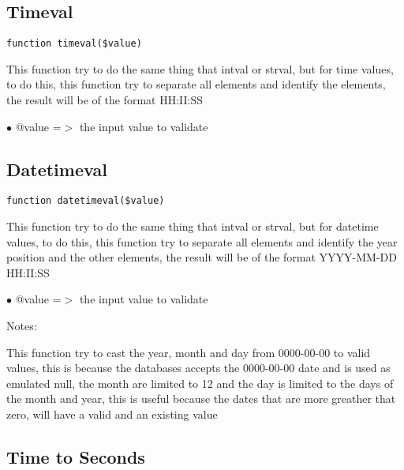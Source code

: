 \documentclass[a4paper]{book}
\begin{document}
\hypertarget{toc80}{}
\subsection{Timeval}

\begin{lstlisting}
function timeval($value)
\end{lstlisting}

This function try to do the same thing that intval or strval, but for time
values, to do this, this function try to separate all elements and identify
the elements, the result will be of the format HH:II:SS

\begin{compactitem}
\item[\color{myblue}$\bullet$] @value =$>$ the input value to validate
\end{compactitem}

\hypertarget{toc81}{}
\subsection{Datetimeval}

\begin{lstlisting}
function datetimeval($value)
\end{lstlisting}

This function try to do the same thing that intval or strval, but for datetime
values, to do this, this function try to separate all elements and identify
the year position and the other elements, the result will be of the format
YYYY-MM-DD HH:II:SS

\begin{compactitem}
\item[\color{myblue}$\bullet$] @value =$>$ the input value to validate
\end{compactitem}

Notes:

This function try to cast the year, month and day from 0000-00-00 to valid
values, this is because the databases accepts the 0000-00-00 date and is used
as emulated null, the month are limited to 12 and the day is limited to the
days of the month and year, this is useful because the dates that are more
greather that zero, will have a valid and an existing value

\hypertarget{toc82}{}
\subsection{Time to Seconds}
\end{document}
